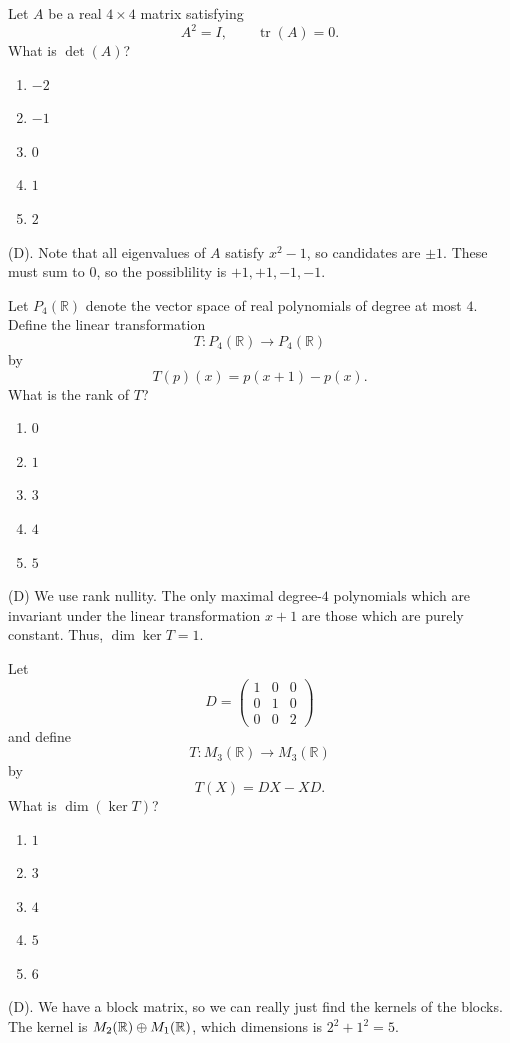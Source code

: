 \begin{exercise}
Let $A$ be a real $4\times4$ matrix satisfying
\[
A^2=I,\qquad \operatorname{tr}(A)=0.
\]
What is $\det(A)$?
\begin{enumerate}[label=(\Alph*)]
    \item $-2$
    \item $-1$
    \item $0$
    \item $1$
    \item $2$
\end{enumerate}
\end{exercise}
\begin{solution}
(D). Note that all eigenvalues of $A$ satisfy $x^2 - 1$, so candidates are $\pm 1$.
These must sum to $0$, so the possiblility is $+1, +1, -1, -1$. 
\end{solution}

\begin{exercise}
Let $P_4(\mathbb R)$ denote the vector space
of real polynomials of degree at most $4$. Define the linear transformation
\[
T:P_4(\mathbb R)\to P_4(\mathbb R)
\]
by
\[
T(p)(x)=p(x+1)-p(x).
\]
What is the rank of $T$?
\begin{enumerate}[label=(\Alph*)]
    \item $0$
    \item $1$
    \item $3$
    \item $4$
    \item $5$
\end{enumerate}
\end{exercise}
\begin{solution}
(D) We use rank nullity. The only maximal degree-$4$ polynomials which are invariant 
under the linear transformation $x + 1$ are those which are purely constant. Thus,
$\dim \ker T = 1$.
\end{solution}

\begin{exercise}
Let
\[
D=\begin{pmatrix}
1&0&0\\
0&1&0\\
0&0&2
\end{pmatrix}
\]
and define
\[
T:M_3(\mathbb R)\to M_3(\mathbb R)
\]
by
\[
T(X)=DX-XD.
\]
What is $\dim(\ker T)$?
\begin{enumerate}[label=(\Alph*)]
    \item $1$
    \item $3$
    \item $4$
    \item $5$
    \item $6$
\end{enumerate}
\end{exercise}
\begin{solution}
(D). We have a block matrix, so we can really just find the kernels of the blocks.
The kernel is $M_2(\mathbb{R}) \oplus M_1(\mathbb{R})$, which dimensions is $2^2 + 1^2 = 5$.
\end{solution}

